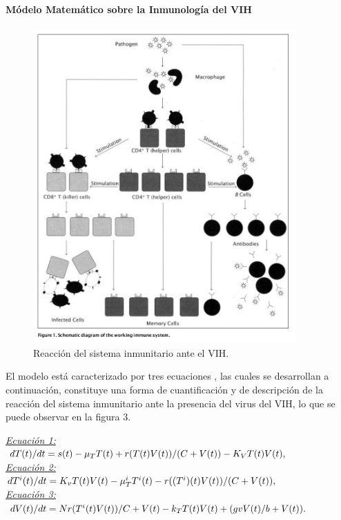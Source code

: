 \documentclass[a4paper,twocolumn,10pt]{article}
\begin{document}
\paragraph{Módelo Matemático sobre la Inmunología del VIH} 
\begin{figure}[htb]
\centering
\includegraphics[width=0.9\textwidth]{./sistemainmuneVIH}
\caption{Reacción del sistema inmunitario ante el VIH. \cite{Kirschner1996}}
\label{fig:sistemainmuneVIH}
\end{figure}
El modelo está caracterizado por tres ecuaciones \cite{Kirschner1996}, las cuales se desarrollan a continuación, constituye una forma de cuantificación y de descripción de la reacción del sistema inmunitario ante la presencia del virus del VIH, lo que se puede observar en la figura 3. 
\begin{center}
\doublespacing
{\itshape \underline{Ecuación 1:}} \\
$dT(t)/dt = s(t)-\mu_TT(t)+ \\ 
r(T(t)V(t))/(C+V(t))- K_VT(t)V(t),$ \\ 
{\itshape \underline {Ecuación 2:}} \\
$dT^i(t)/dt = K_vT(t)V(t)-\mu_T^iT^i(t)-\\
r((T^i)(t)V(t))/(C+V(t)),$ \\
{\itshape \underline {Ecuación 3:}} \\
$dV(t)/dt=Nr(T^i(t)V(t))/C+V(t)-k_TT(t)V(t)+ \\
(gvV(t)/b+V(t)). $ \\
\end{center}
\end{document}
